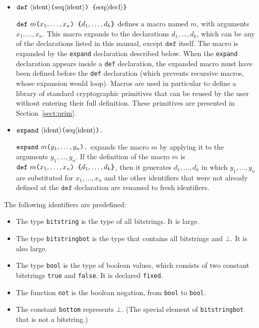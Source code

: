 \begin{itemize}
\item ${\tt def\ }\nonterm{ident}\texttt{(}\seq{ident}\texttt{) \{}
\seq{decl}\texttt{\}}$ 

${\tt def\ }m\texttt{(}x_1, \ldots, x_n\texttt{) \{}
d_1, \ldots, d_k\texttt{\}}$ defines a macro named $m$, with arguments
$x_1, \ldots, x_n$. This macro expands to the declarations
$d_1, \ldots, d_k$, which can be any of the declarations listed in
this manual, except $\texttt{def}$ itself.
The macro is expanded by the \texttt{expand} declaration described below.
When the \texttt{expand} declaration appears inside a \texttt{def}
declaration, the expanded macro must have been defined before the
\texttt{def} declaration (which prevents recursive macros, whose
expansion would loop).
Macros are used in particular to define a library of standard
cryptographic primitives that can be reused by the user without
entering their full definition. These primitives are presented
in Section~\ref{sect:prim}.

\item ${\tt expand\ }\nonterm{ident}\texttt{(}\seq{ident}\texttt{).}$

${\tt expand\ }m\texttt{(}y_1, \ldots, y_n\texttt{).}$ expands the macro
$m$ by applying it to the arguments $y_1, \ldots, y_n$. If the definition
of the macro $m$ is ${\tt def\ }m\texttt{(}x_1, \ldots, x_n\texttt{) \{}
d_1, \ldots, d_k\texttt{\}}$, then it generates $d_1, \ldots, d_k$ in which
$y_1, \ldots, y_n$ are substituted for $x_1, \ldots, x_n$ and the other
identifiers that were not already defined at the $\texttt{def}$ declaration
are renamed to fresh identifiers.

\end{itemize}

The following identifiers are predefined:
\begin{itemize}

\item The type {\tt bitstring} is the type of all bitstrings.
It is large.

\item The type {\tt bitstringbot} is the type that contains
all bitstrings and $\bot$. It is also large.

\item The type {\tt bool} is the type of boolean values, which consists
of two constant bitstrings {\tt true} and {\tt false}.
It is declared {\tt fixed}.

\item The function {\tt not} is the boolean negation, from
{\tt bool} to {\tt bool}.

\item The constant {\tt bottom} represents $\bot$. (The special
element of {\tt bitstringbot} that is not a bitstring.)

\end{itemize}

